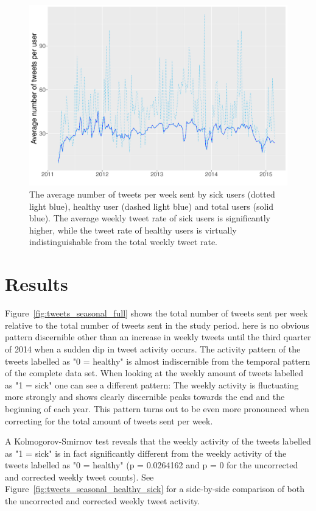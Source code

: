 \documentclass[11pt, a4paper]{report}\usepackage[]{graphicx}\usepackage[]{color}
\begin{document}
\begin{figure}[h]
\centering
\includegraphics[width=1\linewidth]{avg_tw_sick_healthy.pdf}
\caption{The average number of tweets per week sent by sick users (dotted light blue), healthy user (dashed light blue) and total users (solid blue). The average weekly tweet rate of sick users is significantly higher, while the tweet rate of healthy users is virtually indistinguishable from the total weekly tweet rate.}
\label{fig:avg_tw_diff}
\end{figure}

\chapter{Results}
Figure~\ref{fig:tweets_seasonal_full} shows the total number of tweets sent per week relative to the total number of tweets sent in the study period. here is no obvious pattern discernible other than an increase in weekly tweets until the third quarter of 2014 when a sudden dip in tweet activity occurs. The activity pattern of the tweets labelled as "0 = healthy" is almost indiscernible from the temporal pattern of the complete data set. When looking at the weekly amount of tweets labelled as "1 = sick" one can see a different pattern: The weekly activity is fluctuating more strongly and shows clearly discernible peaks towards the end and the beginning of each year. This pattern turns out to be even more pronounced when correcting for the total amount of tweets sent per week.\newline

A Kolmogorov-Smirnov test reveals that the weekly activity of the tweets labelled as "1 = sick" is in fact significantly different from the weekly activity of the tweets labelled as "0 = healthy" (p = 0.0264162 and p = 0 for the uncorrected and corrected weekly tweet counts). See Figure~\ref{fig:tweets_seasonal_healthy_sick} for a side-by-side comparison of both the uncorrected and corrected weekly tweet activity.\newline
\end{document}
